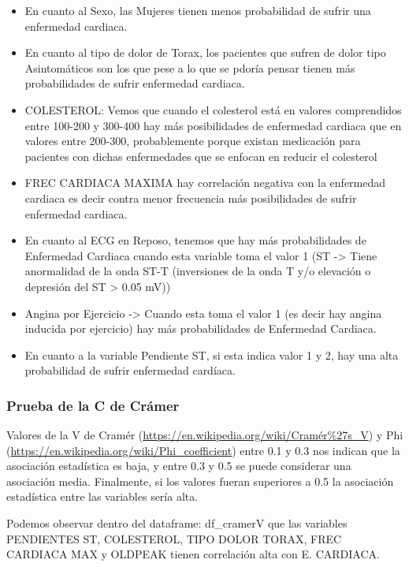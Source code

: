\documentclass[
]{article}
\begin{document}
\begin{itemize}
\item
  En cuanto al Sexo, las Mujeres tienen menos probabilidad de sufrir una
  enfermedad cardiaca.
\item
  En cuanto al tipo de dolor de Torax, los pacientes que sufren de dolor
  tipo Asintomáticos son los que pese a lo que se pdoría pensar tienen
  más probabilidades de sufrir enfermedad cardiaca.
\item
  COLESTEROL: Vemos que cuando el colesterol está en valores
  comprendidos entre 100-200 y 300-400 hay más posibilidades de
  enfermedad cardiaca que en valores entre 200-300, probablemente porque
  existan medicación para pacientes con dichas enfermedades que se
  enfocan en reducir el colesterol
\item
  FREC CARDIACA MAXIMA hay correlación negativa con la enfermedad
  cardiaca es decir contra menor frecuencia más posibilidades de sufrir
  enfermedad cardiaca.
\item
  En cuanto al ECG en Reposo, tenemos que hay más probabilidades de
  Enfermedad Cardiaca cuando esta variable toma el valor 1 (ST
  -\textgreater{} Tiene anormalidad de la onda ST-T (inversiones de la
  onda T y/o elevación o depresión del ST \textgreater{} 0.05 mV))
\item
  Angina por Ejercicio -\textgreater{} Cuando esta toma el valor 1 (es
  decir hay angina inducida por ejercicio) hay más probabilidades de
  Enfermedad Cardiaca.
\item
  En cuanto a la variable Pendiente ST, si esta indica valor 1 y 2, hay
  una alta probabilidad de sufrir enfermedad cardíaca.
\end{itemize}

\hypertarget{prueba-de-la-c-de-cruxe1mer}{%
\subsubsection{Prueba de la C de
Crámer}\label{prueba-de-la-c-de-cruxe1mer}}

Valores de la V de Cramér
(\url{https://en.wikipedia.org/wiki/Cramér\%27s_V}) y Phi
(\url{https://en.wikipedia.org/wiki/Phi_coefficient}) entre 0.1 y 0.3
nos indican que la asociación estadística es baja, y entre 0.3 y 0.5 se
puede considerar una asociación media. Finalmente, si los valores fueran
superiores a 0.5 la asociación estadística entre las variables sería
alta.

Podemos observar dentro del dataframe: df\_cramerV que las variables
PENDIENTES ST, COLESTEROL, TIPO DOLOR TORAX, FREC CARDIACA MAX y OLDPEAK
tienen correlación alta con E. CARDIACA.
\end{document}
